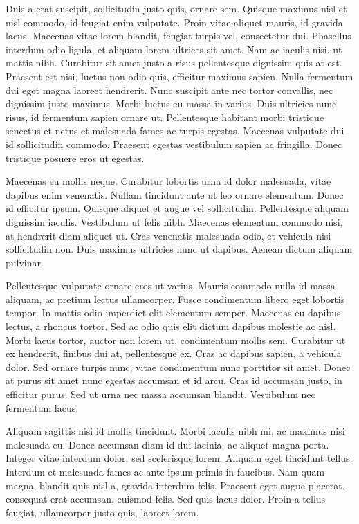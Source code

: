 \documentclass{homework}
\begin{document}
Duis a erat suscipit, sollicitudin justo quis, ornare sem. Quisque maximus nisl et nisl commodo, id feugiat enim vulputate. Proin vitae aliquet mauris, id gravida lacus. Maecenas vitae lorem blandit, feugiat turpis vel, consectetur dui. Phasellus interdum odio ligula, et aliquam lorem ultrices sit amet. Nam ac iaculis nisi, ut mattis nibh. Curabitur sit amet justo a risus pellentesque dignissim quis at est. Praesent est nisi, luctus non odio quis, efficitur maximus sapien. Nulla fermentum dui eget magna laoreet hendrerit. Nunc suscipit ante nec tortor convallis, nec dignissim justo maximus. Morbi luctus eu massa in varius. Duis ultricies nunc risus, id fermentum sapien ornare ut. Pellentesque habitant morbi tristique senectus et netus et malesuada fames ac turpis egestas. Maecenas vulputate dui id sollicitudin commodo. Praesent egestas vestibulum sapien ac fringilla. Donec tristique posuere eros ut egestas.

Maecenas eu mollis neque. Curabitur lobortis urna id dolor malesuada, vitae dapibus enim venenatis. Nullam tincidunt ante ut leo ornare elementum. Donec id efficitur ipsum. Quisque aliquet et augue vel sollicitudin. Pellentesque aliquam dignissim iaculis. Vestibulum ut felis nibh. Maecenas elementum commodo nisi, at hendrerit diam aliquet ut. Cras venenatis malesuada odio, et vehicula nisi sollicitudin non. Duis maximus ultricies nunc ut dapibus. Aenean dictum aliquam pulvinar.

Pellentesque vulputate ornare eros ut varius. Mauris commodo nulla id massa aliquam, ac pretium lectus ullamcorper. Fusce condimentum libero eget lobortis tempor. In mattis odio imperdiet elit elementum semper. Maecenas eu dapibus lectus, a rhoncus tortor. Sed ac odio quis elit dictum dapibus molestie ac nisl. Morbi lacus tortor, auctor non lorem ut, condimentum mollis sem. Curabitur ut ex hendrerit, finibus dui at, pellentesque ex. Cras ac dapibus sapien, a vehicula dolor. Sed ornare turpis nunc, vitae condimentum nunc porttitor sit amet. Donec at purus sit amet nunc egestas accumsan et id arcu. Cras id accumsan justo, in efficitur purus. Sed ut urna nec massa accumsan blandit. Vestibulum nec fermentum lacus.

Aliquam sagittis nisi id mollis tincidunt. Morbi iaculis nibh mi, ac maximus nisi malesuada eu. Donec accumsan diam id dui lacinia, ac aliquet magna porta. Integer vitae interdum dolor, sed scelerisque lorem. Aliquam eget tincidunt tellus. Interdum et malesuada fames ac ante ipsum primis in faucibus. Nam quam magna, blandit quis nisl a, gravida interdum felis. Praesent eget augue placerat, consequat erat accumsan, euismod felis. Sed quis lacus dolor. Proin a tellus feugiat, ullamcorper justo quis, laoreet lorem.
\end{document}
